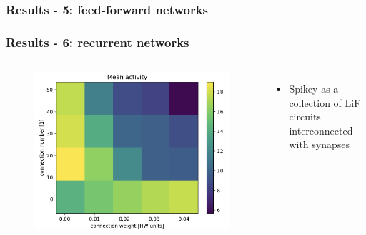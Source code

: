 \documentclass{beamer}
\begin{document}
\begin{frame}
    \frametitle{Results - 5: feed-forward networks}
\end{frame}

\begin{frame}
    \frametitle{Results - 6: recurrent networks}
    \begin{columns}
          	\begin{figure}
    				\centering
    				\includegraphics[width=\linewidth]{figures/activity_sweep.png}
 		   \end{figure}
 		   \begin{itemize}
          		\item Spikey as a collection of LiF circuits interconnected with synapses
          	\end{itemize}


\end{columns}
\end{frame}
\end{document}
